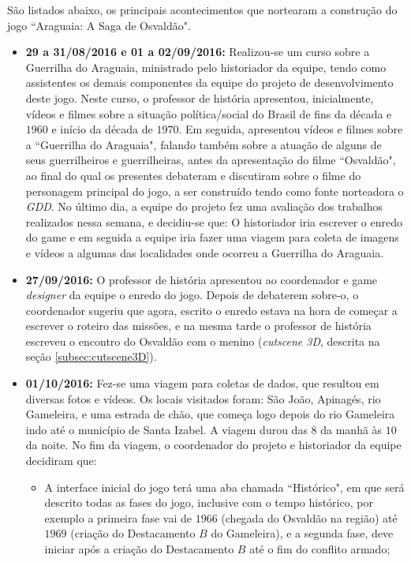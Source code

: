 São listados abaixo, os principais acontecimentos que nortearam a construção do jogo ``Araguaia: A Saga de Osvaldão".

\begin{itemize}
	\item \textbf{29 a 31/08/2016 e 01 a 02/09/2016:} Realizou-se um curso sobre a Guerrilha do Araguaia, ministrado pelo historiador da equipe, tendo como assistentes os demais componentes da equipe do projeto de desenvolvimento deste jogo. Neste curso, o professor de história apresentou, inicialmente, vídeos e filmes sobre a situação política/social do Brasil de fins da década e $1960$ e início da década de $1970$. Em seguida, apresentou vídeos e filmes sobre a ``Guerrilha do Araguaia", falando também sobre a atuação de alguns de seus guerrilheiros e guerrilheiras, antes da apresentação do filme ``Osvaldão", ao final do qual os presentes debateram e discutiram sobre o filme do personagem principal do jogo, a ser construído tendo como fonte norteadora o \textit{GDD}. No último dia, a equipe do projeto fez uma avaliação dos trabalhos realizados nessa semana, e decidiu-se que: O historiador iria escrever o enredo do game e em seguida a equipe iria fazer uma viagem para coleta de imagens e vídeos a algumas das localidades onde ocorreu a Guerrilha do Araguaia.
	
	\item \textbf{27/09/2016:} O professor de história apresentou ao coordenador e game \textit{designer} da equipe o enredo do jogo. Depois de debaterem sobre-o, o coordenador sugeriu que agora, escrito o enredo estava na hora de começar a escrever o roteiro das missões, e na mesma tarde o professor de história escreveu o encontro do Osvaldão com o menino (\textit{cutscene 3D}, descrita na seção \ref{subsec:cutscene3D}).
	
	\item \textbf{01/10/2016:} Fez-se uma viagem para coletas de dados, que resultou em diversas fotos e vídeos. Os locais visitados foram: São João, Apinagés, rio Gameleira, e uma estrada de chão, que começa logo depois do rio Gameleira indo até o município de Santa Izabel. A viagem durou das $8$ da manhã às $10$ da noite. No fim da viagem, o coordenador do projeto e historiador da equipe decidiram que:
	
	\begin{itemize}
		\item A interface inicial do jogo terá uma aba chamada ``Histórico", em que será descrito todas as fases do jogo, inclusive com o tempo histórico, por exemplo a primeira fase vai de $1966$ (chegada do Osvaldão na região) até $1969$ (criação do Destacamento $B$ do Gameleira), e a segunda fase, deve iniciar após a criação do Destacamento $B$ até o fim do conflito armado;
		

\end{itemize}
\end{itemize}
